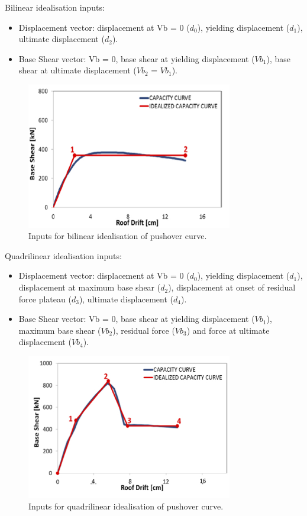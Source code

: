 Bilinear idealisation inputs:
\begin{itemize}
\item Displacement vector: displacement at Vb = 0 ($d_0$), yielding displacement ($d_1$), ultimate displacement ($d_2$).
\item Base Shear vector: Vb = 0, base shear at yielding displacement ($Vb_1$), base shear at ultimate displacement ($Vb_2$ = $Vb_1$).\\
\end{itemize}
\begin{figure}[htb]
  \centering
      \includegraphics[width=9cm]{figures/bilinear.jpg}
  \caption{Inputs for bilinear idealisation of pushover curve.}
  \label{fig:bilinear}
\end{figure}

Quadrilinear idealisation inputs:
\begin{itemize}
\item Displacement vector: displacement at Vb = 0 ($d_0$), yielding displacement ($d_1$), displacement at maximum base shear ($d_2$), displacement at onset of residual force plateau ($d_3$), ultimate displacement ($d_4$).
\item Base Shear vector: Vb = 0, base shear at yielding displacement ($Vb_1$), maximum base shear ($Vb_2$), residual force ($Vb_3$) and force at ultimate displacement ($Vb_4$).\\
\end{itemize} 

\begin{figure}[htb]
  \centering
      \includegraphics[width=9cm]{figures/quadrilinear.jpg}
  \caption{Inputs for quadrilinear idealisation of pushover curve.}
  \label{fig:quadrilinear}
\end{figure}

